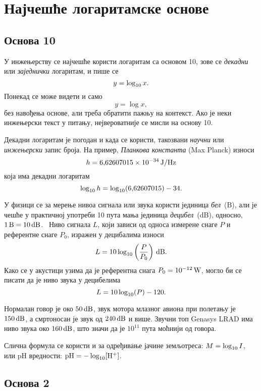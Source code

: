 \section{Најчешће логаритамске основе}

\subsection{Основа 10}

У инжењерству се најчешће користи логаритам са основом 10,
зове се {\sl декадни\/} или {\sl заједнички\/} логаритам, и пише се
$$
y=\log_{10} x.
$$
Понекад се може видети и само
$$
y=\log x,
$$
без навођења основе, али треба обратити пажњу на контекст.
Ако је неки инжењерски текст у питању, нејвероватније се мисли на основу 10.

Декадни логаритам је погодан и када се користи, такозвани
{\sl научни\/} или {\sl инжењерски\/} запис броја.
На пример, {\sl Планкова константа\/} (Max Planck) износи
$$
h=6\.62607015\puta 10^{-34}\um{J/Hz}
$$
која има декадни логаритам
$$
\logten h=\logten(6\.62607015) - 34.
$$

У физици се за мерење нивоа сигнала или звука користи јединица {\sl бел\/}~(B), али је чешће
у практичној употреби 10 пута мања јединица {\sl децибел\/}~(dB), односно, $1\,\hbox{\rm B}=10\,\hbox{\rm dB}$. \
Ниво сигнала $L$, који зависи
од односа измерене снаге $P$ и референтне снаге $P_0$, изражен у децибалима износи
$$
L=10\log_{10}\left(\frac{P}{P_0}\right)\,\hbox{\rm dB}.
$$
Како се у акустици узима да је референтна снага $P_0=10^{-12}\,\hbox{\rm W}$, могло би се писати
да је ниво звука у децибелима
$$
L=10\log_{10}(P)-120.
$$

Нормалан говор је око $50\,\hbox{\rm dB}$,
звук мотора млазног авиона при полетању је $150\,\hbox{\rm dB}$, 
а смртоносан је звук од $240\,\hbox{\rm dB}$ и више.
Звучни топ {\sf Genasys LRAD} има ниво звука око $160\,\hbox{\rm dB}$,
што значи да је $10^{11}$ пута моћнији од говора.

Слична формула се користи и за одређивање јачине земљотреса: $M=\log_{10} I$, или 
pH вредности: ${\rm pH}=-\log_{10}[{\rm H}^+]$.

\subsection{Основа 2}

